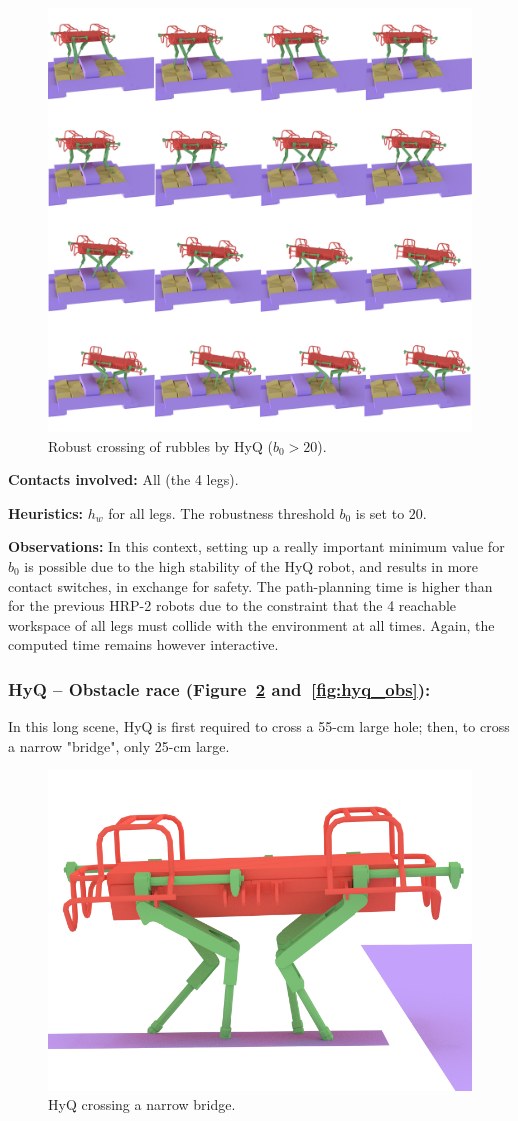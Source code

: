 \begin{figure}
  \centering
  \includegraphics[width=0.5\linewidth]{figures/darpa}
  \caption{
           Robust crossing of rubbles by HyQ ($b_0 > 20$). }
		   \label{fig:darpa}
\end{figure}


\noindent\textbf{Contacts involved:} All (the 4 legs).

\noindent\textbf{Heuristics:} $h_w$  for all legs. The robustness threshold $b_0$ is set to $20$.

\noindent\textbf{Observations:} In this context, setting up a really important minimum value for $b_0$ is possible due to the high
stability of the HyQ robot, and results in more contact switches, in exchange for safety. The path-planning time is higher than for the previous HRP-2 robots due to the constraint that the 4 reachable workspace of all legs must
collide with the environment at all times.  Again, the computed time remains however interactive.

\subsubsection{HyQ -- Obstacle race (Figure~\ref{fig:hyq_bridge} and~\ref{fig:hyq_obs}):}
In this long scene, HyQ is first required to cross a 55-cm large hole; then, to cross a narrow "bridge",  only 25-cm large.

\begin{figure}
  \centering
  \includegraphics[width=0.4\linewidth]{figures/hyq_bridge}
  \caption{
           HyQ crossing a narrow bridge. }
		   \label{fig:hyq_bridge}
\end{figure}

